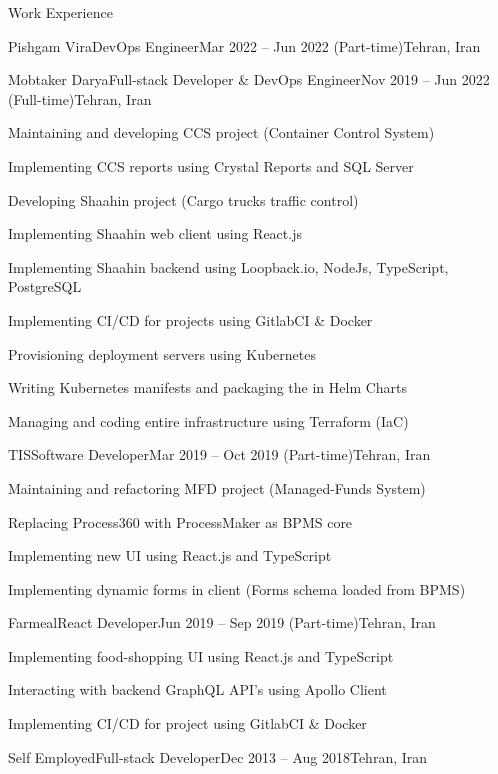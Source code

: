\documentclass[]{main}
\begin{document}
\begin{section}{Work Experience}
\begin{subsection}{Pishgam Vira}{DevOps Engineer}{Mar 2022 -- Jun 2022 (Part-time)}{Tehran, Iran}
        \end{subsection}
\begin{subsection}{Mobtaker Darya}{Full-stack Developer \& DevOps Engineer}{Nov 2019 -- Jun 2022 (Full-time)}{Tehran, Iran}
        \item Maintaining and developing CCS project (Container Control System) 
        \item Implementing CCS reports using Crystal Reports and SQL Server 
        \item Developing Shaahin project (Cargo trucks traffic control) 
        \item Implementing Shaahin web client using React.js 
        \item Implementing Shaahin backend using Loopback.io, NodeJs, TypeScript, PostgreSQL 
        \item Implementing CI/CD for projects using GitlabCI \& Docker 
        \item Provisioning deployment servers using Kubernetes 
        \item Writing Kubernetes manifests and packaging the in Helm Charts 
        \item Managing and coding entire infrastructure using Terraform (IaC) 
        \end{subsection}
\begin{subsection}{TIS}{Software Developer}{Mar 2019 -- Oct 2019 (Part-time)}{Tehran, Iran}
        \item Maintaining and refactoring MFD project (Managed-Funds System) 
        \item Replacing Process360 with ProcessMaker as BPMS core 
        \item Implementing new UI using React.js and TypeScript 
        \item Implementing dynamic forms in client (Forms schema loaded from BPMS) 
        \end{subsection}
\begin{subsection}{Farmeal}{React Developer}{Jun 2019 -- Sep 2019 (Part-time)}{Tehran, Iran}
        \item Implementing food-shopping UI using React.js and TypeScript 
        \item Interacting with backend GraphQL API's using Apollo Client 
        \item Implementing CI/CD for project using GitlabCI \& Docker 
        \end{subsection}
\begin{subsection}{Self Employed}{Full-stack Developer}{Dec 2013 -- Aug 2018}{Tehran, Iran}

\end{subsection}
\end{section}
\end{document}
